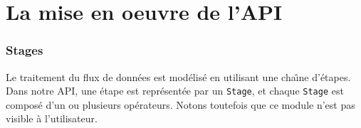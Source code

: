 
\chapter{La mise en oeuvre de l'API}
\label{implementation.chap}


\subsection{Stages}

Le traitement du flux de donn\'ees est mod\'elis\'e en utilisant une cha\^{\i}ne d'\'etapes. Dans notre API, une \'etape est repr\'esent\'ee par un \texttt{Stage}, et chaque \texttt{Stage} est compos\'e d'un ou plusieurs op\'erateurs. Notons toutefois que ce module n'est pas visible \`a l'utilisateur. 


